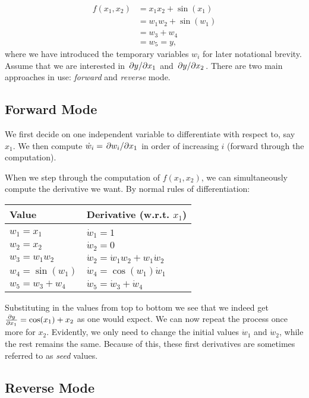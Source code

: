 \documentclass[Thesis.tex]{subfiles}
\begin{document}
\begin{align}
  f(x_1, x_2) &= x_1x_2 + \sin(x_1)\\
              &= w_1w_2 + \sin(w_1)\\
              &= w_3 + w_4\\
              &= w_5 = y,
\end{align}
where we have introduced the temporary variables $w_i$ for later notational brevity.
Assume that we are interested in $\pdv*{y}{x_1}$ and $\pdv*{y}{x_2}$. There are
two main approaches in use: \emph{forward} and \emph{reverse} mode.

\subsection{Forward Mode}

We first decide on one independent variable to differentiate with respect to,
say $x_1$. We then compute $\dot w_i = \pdv*{w_i}{x_1}$ in order of increasing
$i$ (forward through the computation).

When we step through the computation of $f(x_1, x_2)$, we can simultaneously
compute the derivative we want. By normal rules of differentiation:

\begin{center}
  \begin{tabular}{ll}
    Value & Derivative (w.r.t. $x_1$)\\\hline\\
    $w_1 = x_1$ & $\dot w_1 = 1$\\
    $w_2 = x_2$ & $\dot w_2 = 0$\\
    $w_3 = w_1w_2$ & $\dot w_2 = \dot w_1 w_2 + w_1\dot w_2$\\
    $w_4 = \sin(w_1)$ & $\dot w_4 = \cos(w_1)\dot w_1$\\
    $w_5 = w_3 + w_4$ & $\dot w_5 = \dot w_3 +\dot w_4$\\
  \end{tabular}
\end{center}
Substituting in the values from top to bottom we see that we indeed get
$\pdv{y}{x_1}=\cos(x_1)+x_2$ as one would expect. We can now repeat the process
once more for $x_2$. Evidently, we only need to change the initial values $\dot
w_1$ and $\dot w_2$, while the rest remains the same. Because of this, these
 first derivatives are sometimes referred to as \emph{seed} values.

\subsection{Reverse Mode}
\end{document}
